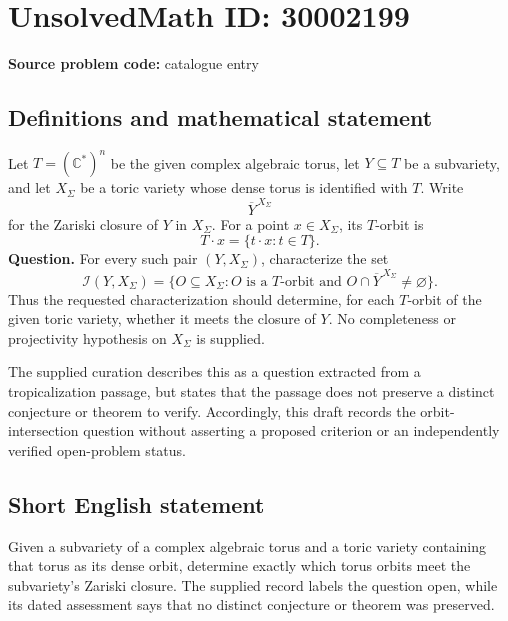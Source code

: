 \documentclass[11pt]{article}
\newcommand{\C}{\mathbb{C}}
\begin{document}
\section*{UnsolvedMath ID: 30002199}
\textbf{Source problem code:} catalogue entry
\subsection{Definitions and mathematical statement}
Let \(T=(\C^*)^n\) be the given complex algebraic torus, let \(Y\subseteq T\) be a subvariety, and let \(X_\Sigma\) be a toric variety whose dense torus is identified with \(T\). Write
\[
\overline{Y}^{\,X_\Sigma}
\]
for the Zariski closure of \(Y\) in \(X_\Sigma\). For a point \(x\in X_\Sigma\), its \(T\)-orbit is
\[
T\cdot x=\{t\cdot x:t\in T\}.
\]
\textbf{Question.} For every such pair \((Y,X_\Sigma)\), characterize the set
\[
\mathcal{I}(Y,X_\Sigma)
=
\bigl\{O\subseteq X_\Sigma: O\text{ is a }T\text{-orbit and }O\cap\overline{Y}^{\,X_\Sigma}\ne\varnothing\bigr\}.
\]
Thus the requested characterization should determine, for each \(T\)-orbit of the given toric variety, whether it meets the closure of \(Y\). No completeness or projectivity hypothesis on \(X_\Sigma\) is supplied.

The supplied curation describes this as a question extracted from a tropicalization passage, but states that the passage does not preserve a distinct conjecture or theorem to verify. Accordingly, this draft records the orbit-intersection question without asserting a proposed criterion or an independently verified open-problem status.
\subsection{Short English statement}
Given a subvariety of a complex algebraic torus and a toric variety containing that torus as its dense orbit, determine exactly which torus orbits meet the subvariety's Zariski closure. The supplied record labels the question open, while its dated assessment says that no distinct conjecture or theorem was preserved.
\end{document}
